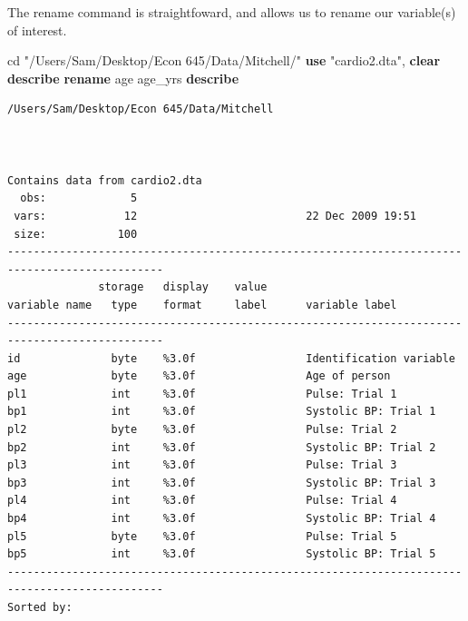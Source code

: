 \documentclass[
]{book}
\newenvironment{Shaded}{\begin{snugshade}}{\end{snugshade}}
\newcommand{\KeywordTok}[1]{\textcolor[rgb]{0.13,0.29,0.53}{\textbf{#1}}}
\newcommand{\NormalTok}[1]{#1}
\newcommand{\StringTok}[1]{\textcolor[rgb]{0.31,0.60,0.02}{#1}}
\begin{document}
The rename command is straightfoward, and allows us to rename
our variable(s) of interest.

\begin{Shaded}
\begin{Highlighting}[]
\NormalTok{cd }\StringTok{"/Users/Sam/Desktop/Econ 645/Data/Mitchell/"}
\KeywordTok{use} \StringTok{"cardio2.dta"}\NormalTok{, }\KeywordTok{clear}
\KeywordTok{describe}
\KeywordTok{rename}\NormalTok{ age age\_yrs}
\KeywordTok{describe}
\end{Highlighting}
\end{Shaded}

\begin{verbatim}
/Users/Sam/Desktop/Econ 645/Data/Mitchell



Contains data from cardio2.dta
  obs:             5                          
 vars:            12                          22 Dec 2009 19:51
 size:           100                          
----------------------------------------------------------------------------------------------
              storage   display    value
variable name   type    format     label      variable label
----------------------------------------------------------------------------------------------
id              byte    %3.0f                 Identification variable
age             byte    %3.0f                 Age of person
pl1             int     %3.0f                 Pulse: Trial 1
bp1             int     %3.0f                 Systolic BP: Trial 1
pl2             byte    %3.0f                 Pulse: Trial 2
bp2             int     %3.0f                 Systolic BP: Trial 2
pl3             int     %3.0f                 Pulse: Trial 3
bp3             int     %3.0f                 Systolic BP: Trial 3
pl4             int     %3.0f                 Pulse: Trial 4
bp4             int     %3.0f                 Systolic BP: Trial 4
pl5             byte    %3.0f                 Pulse: Trial 5
bp5             int     %3.0f                 Systolic BP: Trial 5
----------------------------------------------------------------------------------------------
Sorted by: 




\end{verbatim}
\end{document}
